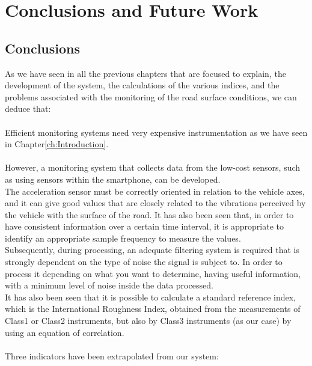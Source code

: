 \documentclass[tesi]{subfiles}
\begin{document}
\chapter{Conclusions and Future Work}\label{ch:c_and_fw}
\section{Conclusions}
As we have seen in all the previous chapters that are focused to explain, the development of the system, the calculations of the various indices, and the problems associated with the monitoring of the road surface conditions, we can deduce that:\\\\
\noindent Efficient monitoring systems need very expensive instrumentation as we have seen in Chapter\ref{ch:Introduction}.\\\\
\noindent However, a monitoring system that collects data from the low-cost sensors, such as using sensors within the smartphone, can be developed.\\
The acceleration sensor must be correctly oriented in relation to the vehicle axes, and it can give good values that are closely related to the vibrations perceived by the vehicle with the surface of the road. It has also been seen that, in order to have consistent information over a certain time interval, it is appropriate to identify an appropriate sample frequency to measure the values.\\
Subsequently, during processing, an adequate filtering system is required that is strongly dependent on the type of noise the signal is subject to. In order to process it depending on what you want to determine, having useful information, with a minimum level of noise inside the data processed.\\
It has also been seen that it is possible to calculate a standard reference index, which is the International Roughness Index,  obtained from the measurements of Class1 or Class2 instruments, but also by Class3 instruments (as our case) by using an equation of correlation.\\\\
\noindent Three indicators have been extrapolated from our system:
\end{document}
